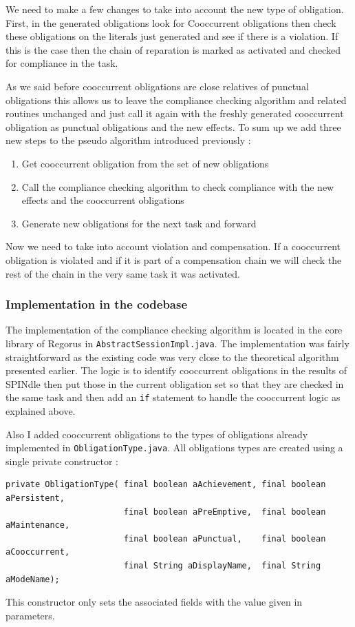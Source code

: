 \documentclass[10pt]{report}
\providecommand{\inlinecode}[1]{\lstinline$#1$} %
\begin{document}
We need to make a few changes to take into account the new type of obligation. First, in the generated obligations look for Cooccurrent obligations then check these obligations on the literals just generated and see if there is a violation. If this is the case then the chain of reparation is marked as activated and checked for compliance in the task.

As we said before cooccurrent obligations are close relatives of punctual obligations this allows us to leave the compliance checking algorithm and related routines unchanged and just call it again with the freshly generated cooccurrent obligation as punctual obligations and the new effects. To sum up we add three new steps to the pseudo algorithm introduced previously :
\begin{enumerate}
\item Get cooccurrent obligation from the set of new obligations
\item Call the compliance checking algorithm to check compliance with the new effects and the cooccurrent obligations
\item Generate new obligations for the next task and forward
\end{enumerate}

Now we need to take into account violation and compensation. If a cooccurrent obligation is violated and if it is part of a compensation chain we will check the rest of the chain in the very same task it was activated.

\subsubsection{Implementation in the codebase}

The implementation of the compliance checking algorithm is located in the core library of Regorus in \inlinecode{AbstractSessionImpl.java}. The implementation was fairly straightforward as the existing code was very close to the theoretical algorithm presented earlier. The logic is to identify cooccurrent obligations in the results of SPINdle then put those in the current obligation set so that they are checked in the same task and then add an \texttt{if} statement to handle the cooccurrent logic as explained above.

Also I added cooccurrent obligations to the types of obligations already implemented in \inlinecode{ObligationType.java}. All obligations types are created using a single private constructor : 
\begin{lstlisting}
private ObligationType( final boolean aAchievement, final boolean aPersistent,
                        final boolean aPreEmptive,  final boolean aMaintenance,
                        final boolean aPunctual,    final boolean aCooccurrent,
                        final String aDisplayName,  final String aModeName);
\end{lstlisting}
This constructor only sets the associated fields with the value given in parameters.
\end{document}
